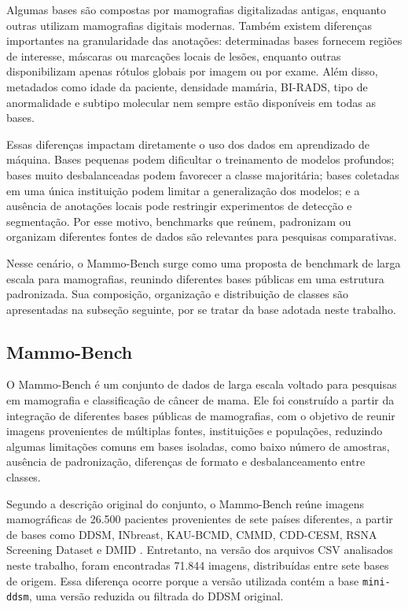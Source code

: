 \documentclass[
    12pt,
    openright,
    oneside,
    a4paper,
    english,
    brazil
]{abntex2}
\begin{document}
Algumas bases são compostas por mamografias digitalizadas antigas, enquanto outras utilizam mamografias digitais modernas. Também existem diferenças importantes na granularidade das anotações: determinadas bases fornecem regiões de interesse, máscaras ou marcações locais de lesões, enquanto outras disponibilizam apenas rótulos globais por imagem ou por exame. Além disso, metadados como idade da paciente, densidade mamária, BI-RADS, tipo de anormalidade e subtipo molecular nem sempre estão disponíveis em todas as bases.

Essas diferenças impactam diretamente o uso dos dados em aprendizado de máquina. Bases pequenas podem dificultar o treinamento de modelos profundos; bases muito desbalanceadas podem favorecer a classe majoritária; bases coletadas em uma única instituição podem limitar a generalização dos modelos; e a ausência de anotações locais pode restringir experimentos de detecção e segmentação. Por esse motivo, benchmarks que reúnem, padronizam ou organizam diferentes fontes de dados são relevantes para pesquisas comparativas.

Nesse cenário, o Mammo-Bench surge como uma proposta de benchmark de larga escala para mamografias, reunindo diferentes bases públicas em uma estrutura padronizada. Sua composição, organização e distribuição de classes são apresentadas na subseção seguinte, por se tratar da base adotada neste trabalho.

\subsection{Mammo-Bench}

O Mammo-Bench é um conjunto de dados de larga escala voltado para pesquisas em mamografia e classificação de câncer de mama. Ele foi construído a partir da integração de diferentes bases públicas de mamografias, com o objetivo de reunir imagens provenientes de múltiplas fontes, instituições e populações, reduzindo algumas limitações comuns em bases isoladas, como baixo número de amostras, ausência de padronização, diferenças de formato e desbalanceamento entre classes.

Segundo a descrição original do conjunto, o Mammo-Bench reúne imagens mamográficas de 26.500 pacientes provenientes de sete países diferentes, a partir de bases como DDSM, INbreast, KAU-BCMD, CMMD, CDD-CESM, RSNA Screening Dataset e DMID \cite{Bhole2025MammoBench}. Entretanto, na versão dos arquivos CSV analisados neste trabalho, foram encontradas 71.844 imagens, distribuídas entre sete bases de origem. Essa diferença ocorre porque a versão utilizada contém a base \texttt{mini-ddsm}, uma versão reduzida ou filtrada do DDSM original.
\end{document}
